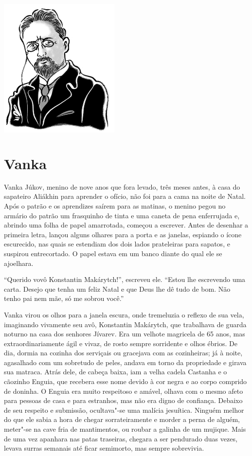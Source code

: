 \pagebreak
\thispagestyle{empty}
\mbox{}
\vfill
\begin{center}
\includegraphics[width=6cm]{./imgs/autor6.jpg}
\end{center}

\chapter{Vanka}

Vanka Júkov, menino de nove anos que fora levado, três meses antes, à
casa do sapateiro Aliákhin para aprender o ofício, não foi para a cama
na noite de Natal. Após o patrão e os aprendizes saírem para as matinas,
o menino pegou no armário do patrão um frasquinho de tinta e uma caneta
de pena enferrujada e, abrindo uma folha de papel amarrotada, começou a
escrever. Antes de desenhar a primeira letra, lançou alguns olhares para
a porta e as janelas, espiando o ícone escurecido, nas quais se
estendiam dos dois lados prateleiras para sapatos, e suspirou
entrecortado. O papel estava em um banco diante do qual ele se
ajoelhara.

``Querido vovô Konstantin Makárytch!'', escreveu ele. ``Estou lhe
escrevendo uma carta. Desejo que tenha um feliz Natal e que Deus lhe dê
tudo de bom. Não tenho pai nem mãe, só me sobrou você.''

Vanka virou os olhos para a janela escura, onde tremeluzia o reflexo de
sua vela, imaginando vivamente seu avô, Konstantin Makárytch, que
trabalhava de guarda noturno na casa dos senhores Jívarev. Era um
velhote magricela de 65 anos, mas extraordinariamente ágil e vivaz, de
rosto sempre sorridente e olhos ébrios. De dia, dormia na cozinha dos
serviçais ou gracejava com as cozinheiras; já à noite, agasalhado com um
sobretudo de peles, andava em torno da propriedade e girava sua matraca.
Atrás dele, de cabeça baixa, iam a velha cadela Castanha e o cãozinho
Enguia, que recebera esse nome devido à cor negra e ao corpo comprido de
doninha. O Enguia era muito respeitoso e amável, olhava com o mesmo
afeto para pessoas de casa e para estranhos, mas não era digno de
confiança. Debaixo de seu respeito e submissão, ocultava"-se uma malícia
jesuítica. Ninguém melhor do que ele sabia a hora de chegar
sorrateiramente e morder a perna de alguém, meter"-se na cave fria de
mantimentos, ou roubar a galinha de um mujique. Mais de uma vez apanhara
nas patas traseiras, chegara a ser pendurado duas vezes, levava surras
semanais até ficar semimorto, mas sempre sobrevivia.

